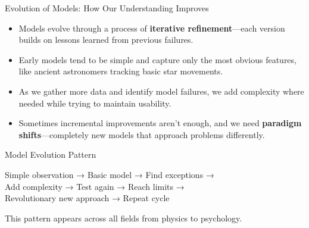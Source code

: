 \documentclass{beamer}
\begin{document}
\begin{frame}{Evolution of Models: How Our Understanding Improves}
	\begin{itemize}
		\item Models evolve through a process of \textbf{iterative refinement}—each version builds on lessons learned from previous failures.
		\item Early models tend to be simple and capture only the most obvious features, like ancient astronomers tracking basic star movements.
		\item As we gather more data and identify model failures, we add complexity where needed while trying to maintain usability.
		\item Sometimes incremental improvements aren't enough, and we need \textbf{paradigm shifts}—completely new models that approach problems differently.
	\end{itemize}
	
	\begin{block}{Model Evolution Pattern}
		\begin{center}
			Simple observation → Basic model → Find exceptions → \\
			Add complexity → Test again → Reach limits → \\
			Revolutionary new approach → Repeat cycle
		\end{center}
		This pattern appears across all fields from physics to psychology.
	\end{block}
\end{frame}
\end{document}
